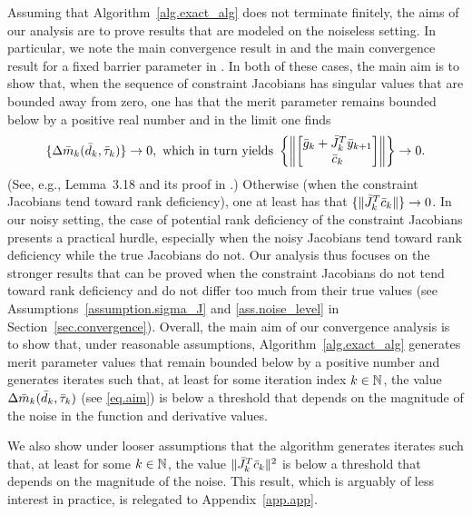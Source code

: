 Assuming that Algorithm~\ref{alg.exact_alg} does not terminate finitely, the aims of our analysis are to prove results that are modeled on the noiseless setting.  In particular, we note the main convergence result in \cite{curtis2010matrix} and the main convergence result for a fixed barrier parameter in \cite{CurtScheWaec10}.  In both of these cases, the main aim is to show that, when the sequence of constraint Jacobians has singular values that are bounded away from zero, one has that the merit parameter remains bounded below by a positive real number and in the limit one finds
\begin{equation}\label{eq.aim}
  \{ \Delta \mtrue_k (\dtrue_k, \tautrue_k) \} \to 0,\ \text{which in turn yields}\ 
  \left\{ \left\| \begin{bmatrix} \gtrue_k + \Jtrue_k^T \ytrue_{k+1} \\ \ctrue_k \end{bmatrix} \right\| \right\} \to 0.
\end{equation}
(See, e.g., Lemma~3.18 and its proof in \cite{curtis2010matrix}.)  Otherwise (when the constraint Jacobians tend toward rank deficiency), one at least has that $\{\|{\bar J}_k^T{\bar c}_k\|\} \to 0$.  In our noisy setting, the case of potential rank deficiency of the constraint Jacobians presents a practical hurdle, especially when the noisy Jacobians tend toward rank deficiency while the true Jacobians do not.  Our analysis thus focuses on the stronger results that can be proved when the constraint Jacobians do not tend toward rank deficiency and do not differ too much from their true values (see Assumptions~\ref{assumption.sigma_J} and \ref{ass.noise_level} in Section~\ref{sec.convergence}).  Overall, the main aim of our convergence analysis is to show that, under reasonable assumptions, Algorithm~\ref{alg.exact_alg} generates merit parameter values that remain bounded below by a positive number and generates iterates such that, at least for some iteration index $k \in \mathbb{N}$, the value $\Delta {\bar m}_k ({\bar d}_k, {\bar \tau}_k)$ (see \eqref{eq.aim}) is below a threshold that depends on the magnitude of the noise in the function and derivative values.

We also show under looser assumptions that the algorithm generates iterates such that, at least for some $k \in \mathbb{N}$, the value $\|{\bar J}_k^T{\bar c}_k\|^2$ is below a threshold that depends on the magnitude of the noise.  This result, which is arguably of less interest in practice, is relegated to Appendix~\ref{app.app}.

